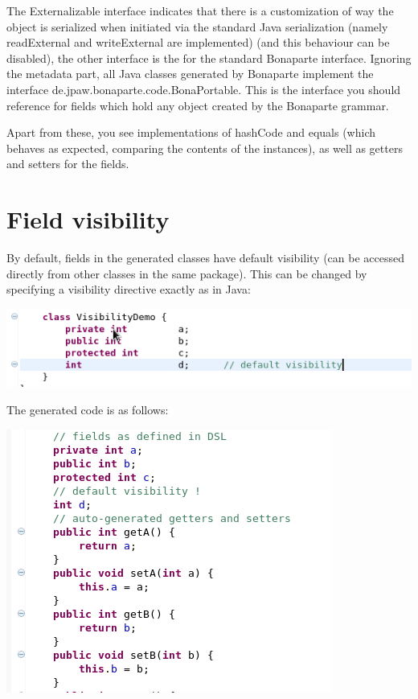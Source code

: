 \documentclass[11pt,a4paper,oneside]{article}
\begin{document}
\noindent 
The {\ttfamily Externalizable} interface indicates that there is a customization of way the object is serialized when initiated
via the standard Java serialization (namely {\ttfamily readExternal} and {\ttfamily writeExternal} are implemented) (and this behaviour can be disabled),
the other interface is the for the standard Bonaparte interface. Ignoring the metadata part, all Java classes generated by Bonaparte implement the interface
 {\ttfamily de.jpaw.bonaparte.code.BonaPortable}. This is the interface you should reference for fields which hold any object created by the Bonaparte grammar.

Apart from these, you see implementations of {\ttfamily hashCode} and {\ttfamily equals} (which behaves as expected, comparing the contents of
the instances), as well as getters and setters for the fields.

\section{Field visibility}
By default, fields in the generated classes have default visibility (can be accessed directly from other classes in the same package). This can be changed by
specifying a visibility directive exactly as in Java:

\vspace{2mm}
\hspace{1cm}\includegraphics[scale=0.5]{images/tut1-006.png}
 
\noindent The generated code is as follows:

\vspace{2mm}
\hspace{1cm}\includegraphics[scale=0.5]{images/tut1-008.png}
 
\end{document}
